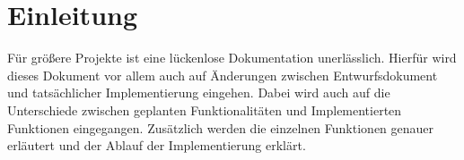 \chapter{Einleitung}
    Für größere Projekte ist eine lückenlose Dokumentation unerlässlich. Hierfür wird dieses Dokument vor allem auch auf Änderungen zwischen Entwurfsdokument und tatsächlicher Implementierung eingehen. Dabei wird auch auf die Unterschiede zwischen geplanten Funktionalitäten und Implementierten Funktionen eingegangen. Zusätzlich werden die einzelnen Funktionen genauer erläutert und der Ablauf der Implementierung erklärt.\newline
        
    
